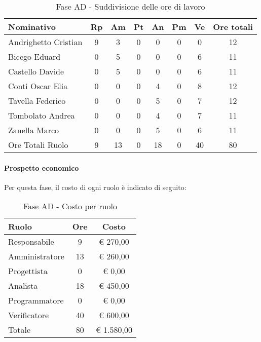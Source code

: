 \documentclass[../PianoProgetto.tex]{subfiles}
\begin{document}
					\begin{table}[h]
		\centering
	
		\begin{tabular}{l * {7}{c}}
			\toprule
			Nominativo & Rp & Am & Pt & An & Pm & Ve & Ore totali \\
			\midrule
			Andrighetto Cristian & 9 & 3 &	0 &	0 & 0 & 0 & 12 \\
			\midrule
			Bicego Eduard & 0 & 5 & 0 & 0 & 0 & 6 & 11 \\
			\midrule
			Castello Davide & 0 & 5 & 0 & 0 & 0 & 6 & 11 \\
			\midrule
			Conti Oscar Elia & 0 & 0 &	0 &	4 & 0 & 8 & 12 \\
			\midrule
			Tavella Federico &	0 & 0 & 0 & 5 & 0 & 7 & 12 \\
			\midrule
			Tombolato Andrea & 0 & 0 &	0 &	4 & 0 & 7 & 11 \\
			\midrule
			Zanella Marco & 0 & 0 & 0 & 5 & 0 & 6 & 11 \\
			\midrule			
			Ore Totali Ruolo & 9 & 13 & 0 & 18 & 0 & 40 & 80 \\
			\bottomrule
			
		\end{tabular}
		
		\caption{Fase AD - Suddivisione delle ore di lavoro}
		\label{tab:faseAD_ore}
		
	\end{table}
	
	\paragraph{Prospetto economico}
					Per questa fase, il costo di ogni ruolo è indicato di seguito:
					\begin{table}[h]
		\centering
	
		\begin{tabular}{l * {2}{c}}
			\toprule
			Ruolo & Ore & Costo \\
			\midrule
			Responsabile &	9 & \euro{} 270,00 \\
			\midrule
			Amministratore & 13 & \euro{} 260,00 \\
			\midrule
			Progettista & 0 & \euro{} 0,00 \\
			\midrule
			Analista & 18 & \euro{} 450,00 \\
			\midrule
			Programmatore & 0 & \euro{} 0,00 \\
			\midrule
			Verificatore & 40 & \euro{} 600,00 \\
			\midrule		
			Totale & 80 & \euro{} 1.580,00 \\
			\bottomrule
			
		\end{tabular}
		
		\caption{Fase AD - Costo per ruolo}
		\label{tab:faseAD_costo}
		
	\end{table}
	
\end{document}
